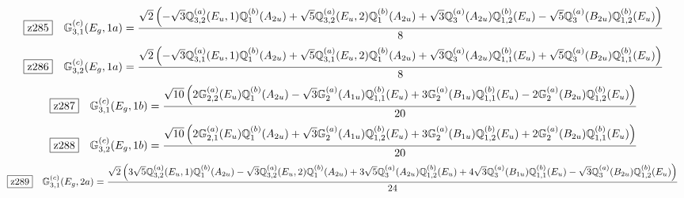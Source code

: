 \documentclass[fleqn,10pt,landscape]{jsarticle}
\begin{document}
\begin{dmath*}
\hspace*{3mm}\fbox{z285}\quad \mathbb{G}_{3,1}^{(c)}(E_{g},1a)=\frac{\sqrt{2} \left(- \sqrt{3} \mathbb{Q}_{3,2}^{(a)}(E_{u},1) \mathbb{Q}_{1}^{(b)}(A_{2u}) + \sqrt{5} \mathbb{Q}_{3,2}^{(a)}(E_{u},2) \mathbb{Q}_{1}^{(b)}(A_{2u}) + \sqrt{3} \mathbb{Q}_{3}^{(a)}(A_{2u}) \mathbb{Q}_{1,2}^{(b)}(E_{u}) - \sqrt{5} \mathbb{Q}_{3}^{(a)}(B_{2u}) \mathbb{Q}_{1,2}^{(b)}(E_{u})\right)}{8}
\end{dmath*}
\begin{dmath*}
\hspace*{3mm}\fbox{z286}\quad \mathbb{G}_{3,2}^{(c)}(E_{g},1a)=\frac{\sqrt{2} \left(- \sqrt{3} \mathbb{Q}_{3,1}^{(a)}(E_{u},1) \mathbb{Q}_{1}^{(b)}(A_{2u}) + \sqrt{5} \mathbb{Q}_{3,1}^{(a)}(E_{u},2) \mathbb{Q}_{1}^{(b)}(A_{2u}) + \sqrt{3} \mathbb{Q}_{3}^{(a)}(A_{2u}) \mathbb{Q}_{1,1}^{(b)}(E_{u}) + \sqrt{5} \mathbb{Q}_{3}^{(a)}(B_{2u}) \mathbb{Q}_{1,1}^{(b)}(E_{u})\right)}{8}
\end{dmath*}
\begin{dmath*}
\hspace*{3mm}\fbox{z287}\quad \mathbb{G}_{3,1}^{(c)}(E_{g},1b)=\frac{\sqrt{10} \left(2 \mathbb{G}_{2,2}^{(a)}(E_{u}) \mathbb{Q}_{1}^{(b)}(A_{2u}) - \sqrt{3} \mathbb{G}_{2}^{(a)}(A_{1u}) \mathbb{Q}_{1,1}^{(b)}(E_{u}) + 3 \mathbb{G}_{2}^{(a)}(B_{1u}) \mathbb{Q}_{1,1}^{(b)}(E_{u}) - 2 \mathbb{G}_{2}^{(a)}(B_{2u}) \mathbb{Q}_{1,2}^{(b)}(E_{u})\right)}{20}
\end{dmath*}
\begin{dmath*}
\hspace*{3mm}\fbox{z288}\quad \mathbb{G}_{3,2}^{(c)}(E_{g},1b)=\frac{\sqrt{10} \left(2 \mathbb{G}_{2,1}^{(a)}(E_{u}) \mathbb{Q}_{1}^{(b)}(A_{2u}) + \sqrt{3} \mathbb{G}_{2}^{(a)}(A_{1u}) \mathbb{Q}_{1,2}^{(b)}(E_{u}) + 3 \mathbb{G}_{2}^{(a)}(B_{1u}) \mathbb{Q}_{1,2}^{(b)}(E_{u}) + 2 \mathbb{G}_{2}^{(a)}(B_{2u}) \mathbb{Q}_{1,1}^{(b)}(E_{u})\right)}{20}
\end{dmath*}
\begin{dmath*}
\hspace*{3mm}\fbox{z289}\quad \mathbb{G}_{3,1}^{(c)}(E_{g},2a)=\frac{\sqrt{2} \left(3 \sqrt{5} \mathbb{Q}_{3,2}^{(a)}(E_{u},1) \mathbb{Q}_{1}^{(b)}(A_{2u}) - \sqrt{3} \mathbb{Q}_{3,2}^{(a)}(E_{u},2) \mathbb{Q}_{1}^{(b)}(A_{2u}) + 3 \sqrt{5} \mathbb{Q}_{3}^{(a)}(A_{2u}) \mathbb{Q}_{1,2}^{(b)}(E_{u}) + 4 \sqrt{3} \mathbb{Q}_{3}^{(a)}(B_{1u}) \mathbb{Q}_{1,1}^{(b)}(E_{u}) - \sqrt{3} \mathbb{Q}_{3}^{(a)}(B_{2u}) \mathbb{Q}_{1,2}^{(b)}(E_{u})\right)}{24}
\end{dmath*}
\end{document}

